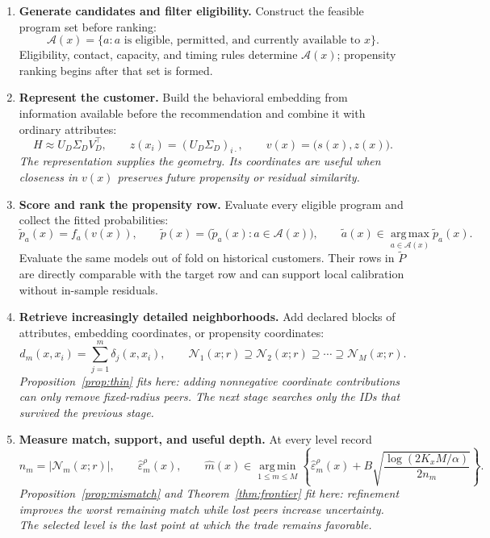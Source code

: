 \documentclass[11pt]{article}
\theoremstyle{noteplain}
\theoremstyle{definition}
\newcommand{\cA}{\mathcal A}
\newcommand{\cN}{\mathcal N}
\newcommand{\argmax}{\operatorname*{arg\,max}}
\newcommand{\argmin}{\operatorname*{arg\,min}}
\begin{document}
\begin{enumerate}[label=\textbf{\arabic*.},itemsep=.7ex]
\item \textbf{Generate candidates and filter eligibility.} Construct the feasible program set before ranking:
\[
 \cA(x)=\{a:\text{$a$ is eligible, permitted, and currently available to $x$}\}.
\]
Eligibility, contact, capacity, and timing rules determine $\cA(x)$; propensity ranking begins after that set is formed.

\item \textbf{Represent the customer.} Build the behavioral embedding from information available before the recommendation and combine it with ordinary attributes:
\[
 H\approx U_D\Sigma_DV_D^\top,
 \qquad z(x_i)=(U_D\Sigma_D)_{i\cdot},
 \qquad v(x)=\bigl(s(x),z(x)\bigr).
\]
\emph{The representation supplies the geometry. Its coordinates are useful when closeness in $v(x)$ preserves future propensity or residual similarity.}

\item \textbf{Score and rank the propensity row.} Evaluate every eligible program and collect the fitted probabilities:
\[
 \widetilde p_a(x)=f_a(v(x)),
 \qquad
 \widetilde p(x)=\bigl(\widetilde p_a(x):a\in\cA(x)\bigr),
 \qquad
 \widetilde a(x)\in\argmax_{a\in\cA(x)}\widetilde p_a(x).
\]
Evaluate the same models out of fold on historical customers. Their rows in $\widetilde P$ are directly comparable with the target row and can support local calibration without in-sample residuals.

\item \textbf{Retrieve increasingly detailed neighborhoods.} Add declared blocks of attributes, embedding coordinates, or propensity coordinates:
\[
 d_m(x,x_i)=\sum_{j=1}^m\delta_j(x,x_i),
 \qquad
 \cN_1(x;r)\supseteq\cN_2(x;r)\supseteq\cdots\supseteq\cN_M(x;r).
\]
\emph{Proposition~\ref{prop:thin} fits here: adding nonnegative coordinate contributions can only remove fixed-radius peers. The next stage searches only the IDs that survived the previous stage.}

\item \textbf{Measure match, support, and useful depth.} At every level record
\[
 n_m=|\cN_m(x;r)|,
 \qquad
 \widehat\varepsilon_m^\rho(x),
 \qquad
 \widehat m(x)\in\argmin_{1\leq m\leq M}
 \left\{\widehat\varepsilon_m^\rho(x)
 +B\sqrt{\frac{\log(2K_xM/\alpha)}{2n_m}}\right\}.
\]
\emph{Proposition~\ref{prop:mismatch} and Theorem~\ref{thm:frontier} fit here: refinement improves the worst remaining match while lost peers increase uncertainty. The selected level is the last point at which the trade remains favorable.}


\end{enumerate}
\end{document}
